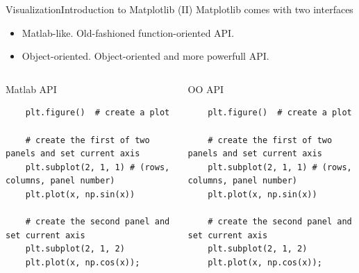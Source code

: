 \documentclass[10pt,compress]{beamer} %
\begin{document}
\begin{frame}[fragile]{Visualization}{Introduction to Matplotlib (II)}
	Matplotlib comes with two interfaces
	\begin{itemize}
		\item Matlab-like. Old-fashioned function-oriented API.
		\item Object-oriented. Object-oriented and more powerfull API.
	\end{itemize}

	\begin{columns}
	\begin{exampleblock}{Matlab API}
	\vspace{-0.2cm} 
	\begin{lstlisting}
	plt.figure()  # create a plot

	# create the first of two panels and set current axis
	plt.subplot(2, 1, 1) # (rows, columns, panel number)
	plt.plot(x, np.sin(x))

	# create the second panel and set current axis
	plt.subplot(2, 1, 2)
	plt.plot(x, np.cos(x));
	\end{lstlisting}
	\vspace{-0.2cm} 
	\end{exampleblock}

	\begin{exampleblock}{OO API}
	\vspace{-0.2cm} 
	\begin{lstlisting}
	plt.figure()  # create a plot

	# create the first of two panels and set current axis
	plt.subplot(2, 1, 1) # (rows, columns, panel number)
	plt.plot(x, np.sin(x))

	# create the second panel and set current axis
	plt.subplot(2, 1, 2)
	plt.plot(x, np.cos(x));
	\end{lstlisting}
	\vspace{-0.2cm} 
	\end{exampleblock}
	\end{columns}
\end{frame}
\end{document}

